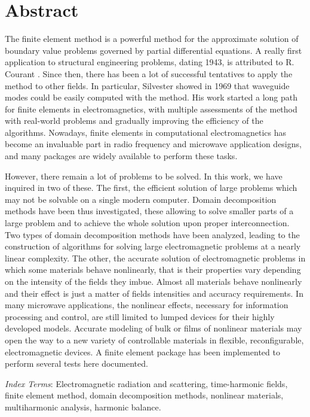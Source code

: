 \chapter*{Abstract}
The finite element method is a powerful method for the approximate solution of boundary value problems governed by partial differential equations. A really first application to structural engineering problems, dating 1943, is attributed to R. Courant \cite{courant1943variational}. Since then, there has been a lot of successful tentatives to apply the method to other fields. In particular, Silvester showed in 1969 \cite{silvester1969finite, coccioli1996finite} that waveguide modes could be easily computed with the method. His work started a long path for finite elements in electromagnetics, with multiple assessments of the method with real-world problems and gradually improving the efficiency of the algorithms. Nowadays, finite elements in computational electromagnetics has become an invaluable part in radio frequency and microwave application designs, and many packages are widely available to perform these tasks. 

However, there remain a lot of problems to be solved. In this work, we have inquired in two of these. 
The first, the efficient solution of large problems which may not be solvable on a single modern computer. Domain decomposition methods have been thus investigated, these allowing to solve smaller parts of a large problem and to achieve the whole solution upon proper interconnection. Two types of domain decomposition methods have been analyzed, leading to the construction of algorithms for solving large electromagnetic problems at a nearly linear complexity. 
The other, the accurate solution of electromagnetic problems in which some materials behave nonlinearly, that is their properties vary depending on the intensity of the fields they imbue. Almost all materials behave nonlinearly and their effect is just a matter of fields intensities and accuracy requirements. In many microwave applications, the nonlinear effects, necessary for information processing and control, are still limited to lumped devices for their highly developed models. Accurate modeling of bulk or films of nonlinear materials may open the way to a new variety of controllable materials in flexible, reconfigurable, electromagnetic devices. A finite element package has been implemented to perform several tests here documented.


\vfill
\noindent \textit{Index Terms}: Electromagnetic radiation and scattering, time-harmonic fields, finite element method, domain decomposition methods, nonlinear materials, multiharmonic analysis, harmonic balance.